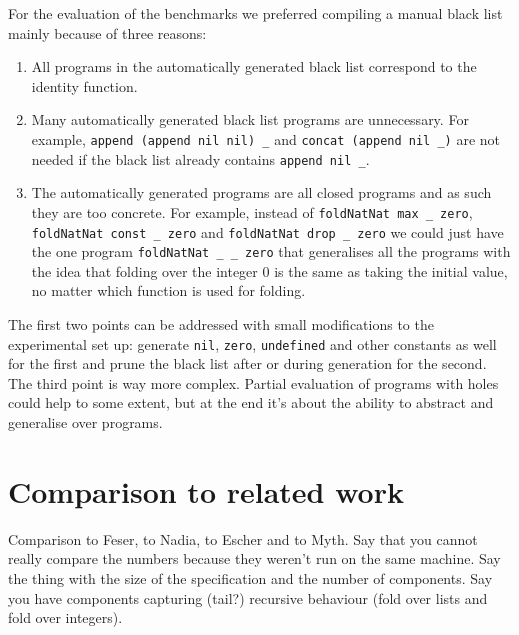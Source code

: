 For the evaluation of the benchmarks we preferred compiling a manual black list mainly because of three reasons: 
\begin{enumerate}
\item All programs in the automatically generated black list correspond to the identity function.
\item Many automatically generated black list programs are unnecessary. For example, \lstinline?append (append nil nil) _? and \lstinline?concat (append nil _)? are not needed if the black list already contains \lstinline?append nil _?.
\item The automatically generated programs are all closed programs and as such they are too concrete. For example, instead of \lstinline?foldNatNat max _ zero?, \lstinline?foldNatNat const _ zero? and \lstinline?foldNatNat drop _ zero? we could just have the one program \lstinline?foldNatNat _ _ zero? that generalises all the programs with the idea that folding over the integer $0$ is the same as taking the initial value, no matter which function is used for folding.
\end{enumerate}

The first two points can be addressed with small modifications to the experimental set up: generate \lstinline?nil?, \lstinline?zero?, \lstinline?undefined? and other constants as well for the first and prune the black list after or during generation for the second.
The third point is way more complex. Partial evaluation of programs with holes could help to some extent, but at the end it's about the ability to abstract and generalise over programs.

\section{Comparison to related work}
Comparison to Feser, to Nadia, to Escher and to Myth. Say that you cannot really compare the numbers because they weren't run on the same machine. Say the thing with the size of the specification and the number of components. Say you have components capturing (tail?) recursive behaviour (fold over lists and fold over integers).


